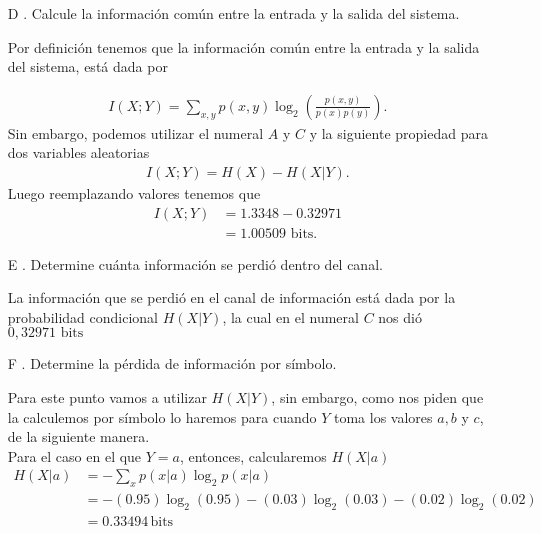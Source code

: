 \begin{enumerate}
\begin{sol}
\end{sol}

    \item[D]. Calcule la información común entre la entrada y la salida del sistema.\\
    \begin{sol}

    Por definición tenemos que la información común entre la entrada y la salida del sistema, está dada por

    \begin{align*}
        I(X;Y) = \sum_{x,y} p(x, y) \log_2 \left( \frac{p(x, y)}{p(x) p(y)}\right)
    .\end{align*}
    Sin embargo, podemos utilizar el numeral $A$ y $C$ y la siguiente propiedad para dos variables aleatorias 
    \begin{align*}
        I(X;Y) =H(X)-H(X|Y)
    .\end{align*}
    Luego reemplazando valores tenemos que 
    \begin{align*}
        I(X;Y) &=1.3348-0.32971\\
        &=1.00509 \text{ bits}
    .\end{align*}
    \end{sol}


    \item[E]. Determine cuánta información se perdió dentro del canal.

\begin{sol}
La información que se perdió en el canal de información está dada por la probabilidad condicional $H(X|Y)$, la cual en el numeral $C$ nos dió $0,32971 \text{ bits}$

\end{sol}

    \item[F]. Determine la pérdida de información por símbolo.
  \begin{sol}
Para este punto vamos a utilizar $H(X|Y)$, sin embargo, como nos piden que la calculemos por símbolo lo haremos para cuando $Y$ toma los valores $a,b$ y $c$, de la siguiente manera.\\
 Para el caso en el que $Y=a$, entonces, calcularemos $H(X|a)$
    \begin{align*}
    H(X| a) &= - \sum_{x} p(x|a) \log_2 p(x|a) \\
    &= -(0.95) \log_2 (0.95) - (0.03) \log_2 (0.03) - (0.02) \log_2 (0.02) \\
    &= 0.33494 \, \text{bits}
    \end{align*}


\end{sol}
\end{enumerate}
